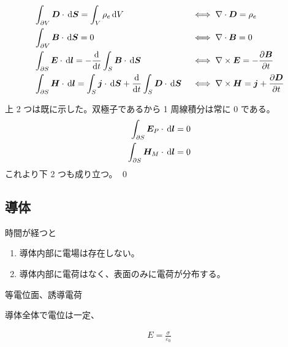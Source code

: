\documentclass[uplatex,dvipdfmx,a4paper,11pt]{jlreq}
\makeatletter
\newcommand{\EE}{\bm{E}}
\newcommand{\BB}{\bm{B}}
\newcommand{\DD}{\bm{D}}
\newcommand{\HH}{\bm{H}}
\renewcommand{\SS}{\bm{S}}
\newcommand{\vnabla}{\mathbf{\nabla}}
\numberwithin{equation}{section}
\theoremstyle{definition}
\renewenvironment{proof}[1][\proofname]{\par
  \normalfont
  \topsep6\p@\@plus6\p@ \trivlist
  \item[\hskip\labelsep{\bfseries #1}\@addpunct{\bfseries}]\ignorespaces\quad\par
}{%
  \qed\endtrivlist\@endpefalse
}
\renewcommand\proofname{証明}
\makeatother
\begin{document}
\begin{theorem}
  \begin{alignat}{3}
     & \int_{\partial V}\DD\cdot\dl{\SS} = \int_V\rho_e\dl{V}                                              &  & \iff \vnabla\cdot\DD  = \rho_e                  \\
     & \int_{\partial V}\BB\cdot\dl{\SS} = 0                                                               &  & \iff \vnabla\cdot\BB  = 0                       \\
     & \int_{\partial S}\EE\cdot\dl{\bm{l}} = -\diff{}{t}\int_S\BB\cdot\dl{\SS}                            &  & \iff \vnabla\times\EE = -\diffp{\BB}{t}         \\
     & \int_{\partial S}\HH\cdot\dl{\bm{l}} = \int_S\bm{j}\cdot\dl{\SS} + \diff{}{t}\int_S\DD\cdot\dl{\SS} &  & \iff \vnabla\times\HH = \bm{j} + \diffp{\DD}{t}
  \end{alignat}
\end{theorem}
\begin{proof}
  上 2 つは既に示した。双極子であるから 1 周線積分は常に $0$ である。
  \begin{align}
    \int_{\partial S}\EE_P\cdot\dl{\bm{l}} = 0 \\
    \int_{\partial S}\HH_M\cdot\dl{\bm{l}} = 0
  \end{align}
  これより下 2 つも成り立つ。
\end{proof}


\subsection{導体}
\begin{definition}[導体]
  時間が経つと
  \begin{enumerate}
    \item 導体内部に電場は存在しない。
    \item 導体内部に電荷はなく、表面のみに電荷が分布する。
  \end{enumerate}
  等電位面、誘導電荷
\end{definition}

導体全体で電位は一定、

\begin{theorem}
  \begin{align}
    E = \frac{\sigma}{\varepsilon_0}
  \end{align}
\end{theorem}

\begin{definition}[静電誘導]

\end{definition}
\end{document}

